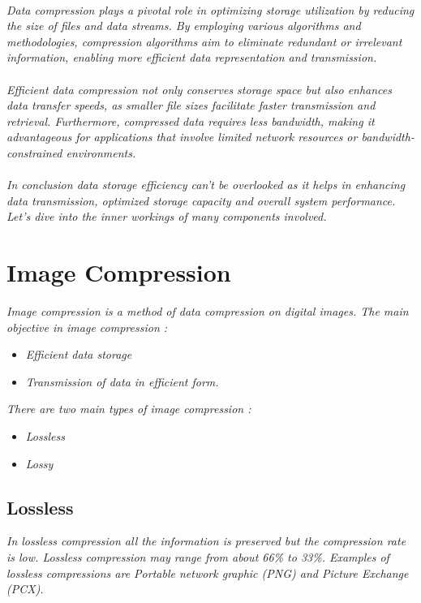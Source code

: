 \documentclass[12pt, letterpaper]{article}
\begin{document}
\paragraph{}\textit{Data compression plays a pivotal role in optimizing storage utilization by reducing the size of files and data streams. By employing various algorithms and methodologies, compression algorithms aim to eliminate redundant or irrelevant information, enabling more efficient data representation and transmission.}

\paragraph{}\textit{Efficient data compression not only conserves storage space but also enhances data transfer speeds, as smaller file sizes facilitate faster transmission and retrieval. Furthermore, compressed data requires less bandwidth, making it advantageous for applications that involve limited network resources or bandwidth-constrained environments.}

\paragraph{}\textit{In conclusion data storage efficiency can’t be overlooked as it helps in enhancing data transmission, optimized storage capacity and overall system performance. Let’s dive into the inner workings of many components involved.}

\section{{\color{blue}Image Compression}}
\textit{Image compression is a method of data compression on digital images. The main objective in image compression : }
\begin{itemize}
    \item \textit{ Efficient data storage }
    \item \textit{  Transmission of data in efficient form.}
\end{itemize}
\textit{There are two main types of image compression :}
\begin{itemize}
    \item \textit{Lossless }
    \item \textit{Lossy}
\end{itemize}
\subsection{{\color{gray}Lossless}}
\textit{In lossless compression all the information is preserved but the compression rate is low. Lossless compression may range from about 66\% to 33\%. Examples of lossless compressions are Portable network graphic (PNG) and Picture Exchange (PCX). }
\end{document}
